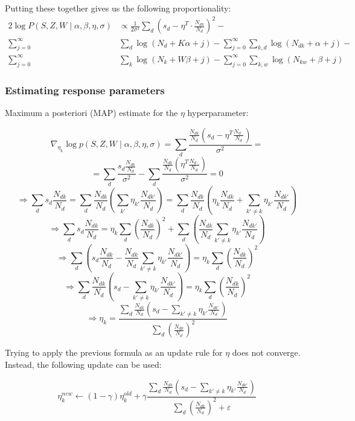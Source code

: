 \documentclass[a4paper,10pt]{article}
\renewcommand{\epsilon}{\varepsilon}
\begin{document}
Putting these together gives us the following proportionality:
\begin{alignat*}{2}
  \log P(S, Z, W \mid \alpha, \beta, \eta, \sigma) &\propto \frac{1}{2 \sigma^2}\sum_d  \left(s_d - \eta^T \cdot \frac{N_{dk}}{N_d}\right)^2 -\\
  \sum_{j=0}^\infty &\sum_d \log(N_d + K\alpha + j) - \sum_{j=0}^\infty \sum_{k,d} \log(N_{dk}+\alpha +j) -\\
  \sum_{j=0}^\infty &\sum_k \log(N_k + W\beta + j) - \sum_{j=0}^\infty \sum_{k,w} \log (N_{kw} + \beta + j)
\end{alignat*}

\subsubsection{Estimating response parameters}
Maximum a posteriori (MAP) estimate for the $\eta$ hyperparameter:

$$ \nabla_{\eta_k} \log p(S, Z, W \mid \alpha, \beta, \eta, \sigma) = \sum_d \frac{ \frac{N_{dk}}{N_d} \left( s_d - \eta^T \frac{N_{d\cdot}}{N_d}\right) }{\sigma^2} = $$
$$ = \sum_d \frac{s_d \frac{N_{dk}}{N_d} }{\sigma^2} - \sum_d \frac{ \frac{N_{dk}}{N_d} \left( \eta^T \frac{N_{d\cdot}}{N_d} \right) }{\sigma^2} = 0 $$
$$ \Rightarrow \sum_d s_d \frac{N_{dk}}{N_d} = \sum_d \frac{N_{dk}}{N_d} \left( \sum_{k'} \eta_{k'} \frac{N_{dk'}}{N_d} \right) = \sum_d \frac{N_{dk}}{N_d} \left( \eta_k \frac{N_{dk}}{N_d} + \sum_{k' \ne k} \eta_{k'} \frac{N_{dk'}}{N_d} \right) $$
$$ \Rightarrow \sum_d s_d \frac{N_{dk}}{N_d} = \eta_k \sum_d \left( \frac{N_{dk}}{N_d}  \right)^2 + \sum_d \left( \frac{N_{dk}}{N_d} \sum_{k' \ne k} \eta_{k'} \frac{N_{dk'}}{N_d} \right) $$
$$ \Rightarrow \sum_d \left( s_d \frac{N_{dk}}{N_d} - \frac{N_{dk}}{N_d} \sum_{k' \ne k} \eta_{k'} \frac{N_{dk'}}{N_d} \right) = \eta_k \sum_d \left( \frac{N_{dk}}{N_d}  \right)^2 $$
$$ \Rightarrow \sum_d \frac{N_{dk}}{N_d} \left( s_d - \sum_{k' \ne k} \eta_{k'} \frac{N_{dk'}}{N_d} \right) = \eta_k \sum_d \left( \frac{N_{dk}}{N_d}  \right)^2 $$
$$ \Rightarrow \eta_k = \frac{\sum_d \frac{N_{dk}}{N_d} \left( s_d - \sum_{k' \ne k} \eta_{k'} \frac{N_{dk'}}{N_d} \right)}{\sum_d \left( \frac{N_{dk}}{N_d}  \right)^2} $$

Trying to apply the previous formula as an update rule for $\eta$ does not converge. Instead, the following update can be used:

$$ \eta_k^{new} \leftarrow (1 - \gamma) \eta_k^{old} + \gamma \frac{\sum_d \frac{N_{dk}}{N_d} \left( s_d - \sum_{k' \ne k} \eta_{k'} \frac{N_{dk'}}{N_d} \right)}{\sum_d \left( \frac{N_{dk}}{N_d}  \right)^2 + \epsilon}$$
\end{document}
